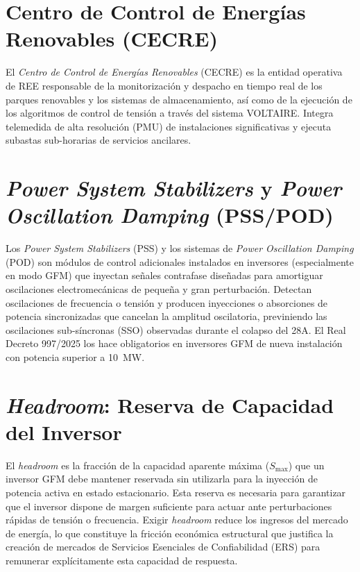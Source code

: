 \section{Centro de Control de Energías Renovables (CECRE)}
\label{anexo:cecre}
El \textit{Centro de Control de Energías Renovables} (CECRE) es la
entidad operativa de REE responsable de la monitorización y despacho en
tiempo real de los parques renovables y los sistemas de almacenamiento,
así como de la ejecución de los algoritmos de control de tensión a través
del sistema VOLTAIRE. Integra telemedida de alta resolución (PMU) de
instalaciones significativas y ejecuta subastas sub-horarias de servicios
ancilares.

\section{\textit{Power System Stabilizers} y \textit{Power Oscillation
Damping} (PSS/POD)}
\label{anexo:pss_pod}
Los \textit{Power System Stabilizers} (PSS) y los sistemas de
\textit{Power Oscillation Damping} (POD) son módulos de control
adicionales instalados en inversores (especialmente en modo GFM) que
inyectan señales contrafase diseñadas para amortiguar oscilaciones
electromecánicas de pequeña y gran perturbación. Detectan oscilaciones
de frecuencia o tensión y producen inyecciones o absorciones de potencia
sincronizadas que cancelan la amplitud oscilatoria, previniendo las
oscilaciones sub-síncronas (SSO) observadas durante el colapso del 28A.
El Real Decreto 997/2025 los hace obligatorios en inversores GFM de nueva
instalación con potencia superior a 10~MW.

\section{\textit{Headroom}: Reserva de Capacidad del Inversor}
\label{anexo:headroom}
El \textit{headroom} es la fracción de la capacidad aparente máxima
($S_{\max}$) que un inversor GFM debe mantener reservada sin utilizarla
para la inyección de potencia activa en estado estacionario. Esta reserva
es necesaria para garantizar que el inversor dispone de margen suficiente
para actuar ante perturbaciones rápidas de tensión o frecuencia. Exigir
\textit{headroom} reduce los ingresos del mercado de energía, lo que
constituye la fricción económica estructural que justifica la creación
de mercados de Servicios Esenciales de Confiabilidad (ERS) para
remunerar explícitamente esta capacidad de respuesta.

